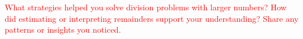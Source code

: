 \documentclass[12pt]{article}
\begin{document}
\begin{tcolorbox}[colframe=black!60, colback=white, 
coltitle=black, colbacktitle=black!15, fonttitle=\bfseries\Large, 
title=Reflection, halign title=center, left=10pt, right=10pt, top=10pt, bottom=100pt]
\textcolor{red}{What strategies helped you solve division problems with larger numbers? How did estimating or interpreting remainders support your understanding? Share any patterns or insights you noticed.}
\end{tcolorbox}
\end{document}
